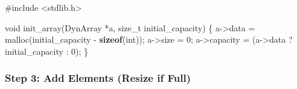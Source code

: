 \documentclass[
  letterpaper,
  DIV=11,
  numbers=noendperiod]{scrreprt}
\newenvironment{Shaded}{\begin{snugshade}}{\end{snugshade}}
\newcommand{\DataTypeTok}[1]{\textcolor[rgb]{0.68,0.00,0.00}{#1}}
\newcommand{\DecValTok}[1]{\textcolor[rgb]{0.68,0.00,0.00}{#1}}
\newcommand{\ImportTok}[1]{\textcolor[rgb]{0.00,0.46,0.62}{#1}}
\newcommand{\KeywordTok}[1]{\textcolor[rgb]{0.00,0.23,0.31}{\textbf{#1}}}
\newcommand{\NormalTok}[1]{\textcolor[rgb]{0.00,0.23,0.31}{#1}}
\newcommand{\OperatorTok}[1]{\textcolor[rgb]{0.37,0.37,0.37}{#1}}
\newcommand{\PreprocessorTok}[1]{\textcolor[rgb]{0.68,0.00,0.00}{#1}}
\begin{document}
\begin{Shaded}
\begin{Highlighting}[]
\PreprocessorTok{\#include }\ImportTok{\textless{}stdlib.h\textgreater{}}

\DataTypeTok{void}\NormalTok{ init\_array}\OperatorTok{(}\NormalTok{DynArray }\OperatorTok{*}\NormalTok{a}\OperatorTok{,} \DataTypeTok{size\_t}\NormalTok{ initial\_capacity}\OperatorTok{)} \OperatorTok{\{}
\NormalTok{    a}\OperatorTok{{-}\textgreater{}}\NormalTok{data }\OperatorTok{=}\NormalTok{ malloc}\OperatorTok{(}\NormalTok{initial\_capacity }\OperatorTok{{-}} \KeywordTok{sizeof}\OperatorTok{(}\DataTypeTok{int}\OperatorTok{));}
\NormalTok{    a}\OperatorTok{{-}\textgreater{}}\NormalTok{size }\OperatorTok{=} \DecValTok{0}\OperatorTok{;}
\NormalTok{    a}\OperatorTok{{-}\textgreater{}}\NormalTok{capacity }\OperatorTok{=} \OperatorTok{(}\NormalTok{a}\OperatorTok{{-}\textgreater{}}\NormalTok{data }\OperatorTok{?}\NormalTok{ initial\_capacity }\OperatorTok{:} \DecValTok{0}\OperatorTok{);}
\OperatorTok{\}}
\end{Highlighting}
\end{Shaded}

\subsubsection{Step 3: Add Elements (Resize if
Full)}\label{step-3-add-elements-resize-if-full}
\end{document}
